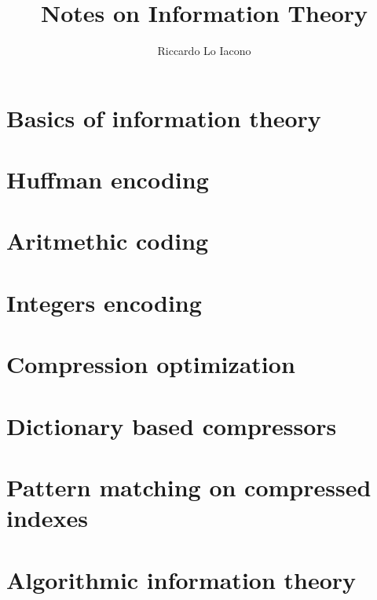 \documentclass[moon, draft]{lectures2}
\title{Notes on Information Theory}
\author{Riccardo Lo Iacono}
\begin{document}
    \maketitle

    \section{Basics of information theory} 
    

    \section{Huffman encoding}
    

    \section{Aritmethic coding}
    

    \section{Integers encoding}
    

    \section{Compression optimization}
    

    \section{Dictionary based compressors}
    

    \section{Pattern matching on compressed indexes}
    

    \section{Algorithmic information theory}
    
    \printbibliography
    \printglossaries
\end{document}
